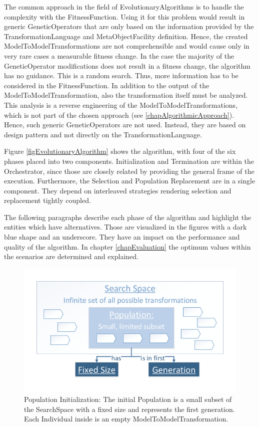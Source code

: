 The common approach in the field of \glspl{EvolutionaryAlgorithm} is to handle the complexity with the \gls{FitnessFunction}. Using it for this problem would result in generic \glspl{GeneticOperator} that are only based on the information provided by the \gls{TransformationLanguage} and \gls{MetaObjectFacility} definition. Hence, the created \glspl{ModelToModelTransformation} are not comprehensible and would cause only in very rare cases a measurable fitness change. In the case the majority of the \gls{GeneticOperator} modifications does not result in a fitness change, the algorithm has no guidance. This is a random search. Thus, more information has to be considered in the \gls{FitnessFunction}. In addition to the output of the \gls{ModelToModelTransformation}, also the transformation itself must be analyzed. This analysis is a reverse engineering of the \glspl{ModelToModelTransformation}, which is not part of the chosen approach (see \ref{chapAlgorithmicApproach}). Hence, such generic \glspl{GeneticOperator} are not used. Instead, they are based on design pattern and not directly on the \gls{TransformationLanguage}.

Figure \ref{figEvolutionaryAlgorithm} shows the algorithm, with four of the six phases placed into two components. Initialization and Termination are within the Orchestrator, since those are closely related by providing the general frame of the execution. Furthermore, the Selection and Population Replacement are in a single component. They depend on interleaved strategies rendering selection and replacement tightly coupled.

The following paragraphs describe each phase of the algorithm and highlight the entities which have alternatives. Those are visualized in the figures with a dark blue shape and an underscore. They have an impact on the performance and quality of the algorithm. In chapter \ref{chapEvaluation} the optimum values within the scenarios are determined and explained.

\begin{figure}[htb]
	\centering
	\includegraphics[scale=0.5]{Images/Algorithm_01_PopulationInitialization.pdf} 
	\caption{Population Initialization: The initial \gls{Population} is a small subset of the \gls{SearchSpace} with a fixed size and represents the first generation. Each \gls{Individual} inside is an empty \gls{ModelToModelTransformation}.}
	\label{figAlgorithm_01_PopulationInitialization}
\end{figure}

